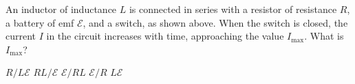 \documentclass[12pt]{../oss-classkick-exam}
\begin{document}
\begin{questions}
%
%  
  
  \question An inductor of inductance $L$ is connected in series with a
  resistor of resistance $R$, a battery of emf $\mathcal{E}$, and a switch, as
  shown above. When the switch is closed, the current $I$ in the circuit
  increases with time, approaching the value $I_\text{max}$. What is
  $I_\text{max}$?
  
  \begin{minipage}{.4\textwidth}
  \end{minipage}
  \begin{minipage}{.4\linewidth}
    \begin{choices}
      \choice $R/L\mathcal E$
      \choice $RL/\mathcal E$
      \choice $\mathcal E/RL$
      \choice $\mathcal E/R$
      \choice $L\mathcal E$
    \end{choices}
  \end{minipage}


\end{questions}
\end{document}

